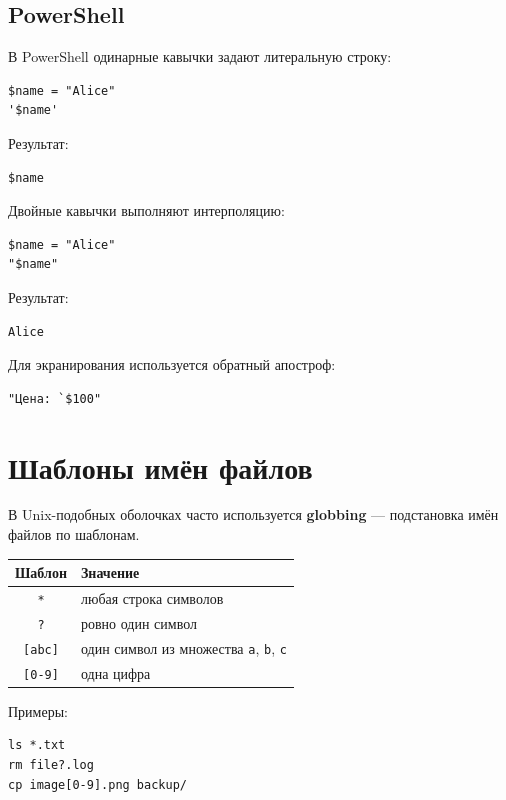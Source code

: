 \documentclass[12pt,a4paper]{article}
\begin{document}
\subsection{PowerShell}

В PowerShell одинарные кавычки задают литеральную строку:

\begin{lstlisting}
$name = "Alice"
'$name'
\end{lstlisting}

Результат:

\begin{lstlisting}
$name
\end{lstlisting}

Двойные кавычки выполняют интерполяцию:

\begin{lstlisting}
$name = "Alice"
"$name"
\end{lstlisting}

Результат:

\begin{lstlisting}
Alice
\end{lstlisting}

Для экранирования используется обратный апостроф:

\begin{lstlisting}
"Цена: `$100"
\end{lstlisting}

\section{Шаблоны имён файлов}

В Unix-подобных оболочках часто используется \textbf{globbing} --- подстановка имён файлов по шаблонам.

\begin{center}
\begin{tabular}{|c|p{9cm}|}
\hline
Шаблон & Значение \\
\hline
\texttt{*} & любая строка символов \\
\texttt{?} & ровно один символ \\
\texttt{[abc]} & один символ из множества \texttt{a}, \texttt{b}, \texttt{c} \\
\texttt{[0-9]} & одна цифра \\
\hline
\end{tabular}
\end{center}

Примеры:

\begin{lstlisting}
ls *.txt
rm file?.log
cp image[0-9].png backup/
\end{lstlisting}
\end{document}
